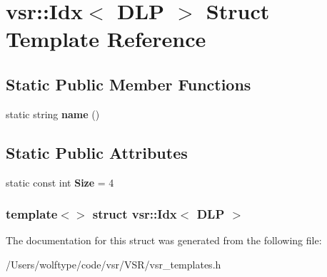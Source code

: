 \hypertarget{structvsr_1_1_idx_3_01_d_l_p_01_4}{\section{vsr\-:\-:Idx$<$ D\-L\-P $>$ Struct Template Reference}
\label{structvsr_1_1_idx_3_01_d_l_p_01_4}
}
\subsection*{Static Public Member Functions}
\begin{DoxyCompactItemize}
\item 
\hypertarget{structvsr_1_1_idx_3_01_d_l_p_01_4_a2e94e2199fccc3172f6ea58a81d6002b}{static string {\bfseries name} ()}\label{structvsr_1_1_idx_3_01_d_l_p_01_4_a2e94e2199fccc3172f6ea58a81d6002b}

\end{DoxyCompactItemize}
\subsection*{Static Public Attributes}
\begin{DoxyCompactItemize}
\item 
\hypertarget{structvsr_1_1_idx_3_01_d_l_p_01_4_ab577ee4cd0eb11d9536bbe499eaaa4f3}{static const int {\bfseries Size} = 4}\label{structvsr_1_1_idx_3_01_d_l_p_01_4_ab577ee4cd0eb11d9536bbe499eaaa4f3}

\end{DoxyCompactItemize}
\subsubsection*{template$<$$>$ struct vsr\-::\-Idx$<$ D\-L\-P $>$}



The documentation for this struct was generated from the following file\-:\begin{DoxyCompactItemize}
\item 
/\-Users/wolftype/code/vsr/\-V\-S\-R/vsr\-\_\-templates.\-h\end{DoxyCompactItemize}
